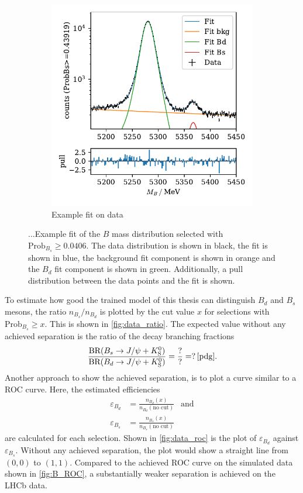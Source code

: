 \begin{figure}
\begin{subfigure}{0.5\textwidth}
        \includegraphics[width=\textwidth]{images/fit_example.pdf}
        \caption{Example fit on data}
        \label{fig:fit_example}
    \end{subfigure}%
    \caption{...Example fit of the $B$ mass distribution selected with $\text{Prob}_{B_s} \geq 0.0406$. The data distribution is shown in black, the fit is shown in blue, the background fit component is shown in orange and the $B_d$ fit component is shown in green. Additionally, a pull distribution between the data points and the fit is shown.} %
\end{figure}

To estimate how good the trained model of this thesis can distinguish $B_d$ and $B_s$ mesons, the ratio $n_{B_s}/n_{B_d}$ is plotted by the cut value $x$ for selections with $\text{Prob}_{B_s} \geq x$. 
This is shown in \autoref{fig:data_ratio}.
The expected value without any achieved separation is the ratio of the decay branching fractions
\begin{equation*}
    \frac{\text{BR}(B_s \rightarrow J/\psi + K^0_\text{S})}{\text{BR}(B_d \rightarrow J/\psi + K^0_\text{S})} =
    \frac{?}{?} = ? \, \text{\cite{pdg}.}
\end{equation*}
Another approach to show the achieved separation, is to plot a curve similar to a ROC curve. 
Here, the estimated efficiencies
\begin{align*}
    \varepsilon_{B_d} &= \frac{n_{B_d}(x)}{n_{B_d}(\text{no cut})} \: \: \text{ and} \\
    \varepsilon_{B_s} &= \frac{n_{B_s}(x)}{n_{B_s}(\text{no cut})}
\end{align*}
are calculated for each selection. Shown in \autoref{fig:data_roc} is the plot of $\varepsilon_{B_d}$ against $\varepsilon_{B_s}$.
Without any achieved separation, the plot would show a straight line from $(0,0)$ to $(1,1)$.
Compared to the achieved ROC curve on the simulated data shown in \autoref{fig:B_ROC}, a substantially weaker separation is achieved on the LHCb data.

